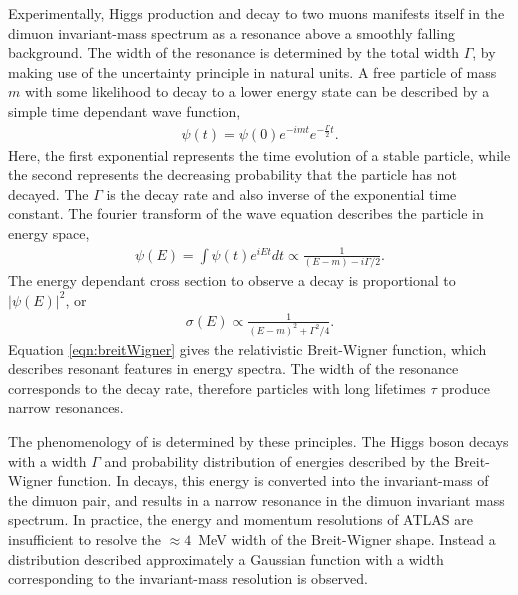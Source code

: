 Experimentally, Higgs production and decay to two muons manifests itself in the dimuon invariant-mass spectrum as a resonance above a smoothly falling background.
The width of the resonance is determined by the total width $\Gamma$, by making use of the uncertainty principle in natural units.
A free particle of mass $m$ with some likelihood to decay to a lower energy state can be described by a simple time dependant wave function,
\begin{equation}\begin{split}
    \psi(t)=\psi(0)e^{-imt}e^{-\frac{\Gamma}{2}t}.
\end{split}\end{equation} 
Here, the first exponential represents the time evolution of a stable particle, while the second represents the decreasing probability that the particle has not decayed.
The $\Gamma$ is the decay rate and also inverse of the exponential time constant.
The fourier transform of the wave equation describes the particle in energy space,
\begin{equation}\begin{split}
    \psi(E)=\int\psi(t)e^{iEt}dt\propto \frac{1}{(E-m)-i\Gamma/2}.
\end{split}\end{equation}
The energy dependant cross section to observe a decay is proportional to $|\psi(E)|^2$, or 
\begin{equation}\begin{split}\label{eqn:breitWigner}
    \sigma(E)\propto\frac{1}{(E-m)^2+\Gamma^2/4}.
\end{split}\end{equation} 
Equation \ref{eqn:breitWigner} gives the relativistic Breit-Wigner function, which describes resonant features in energy spectra.
The width of the resonance corresponds to the decay rate, therefore particles with long lifetimes $\tau$ produce narrow resonances.

The phenomenology of \hmm is determined by these principles.
The Higgs boson decays with a width $\Gamma$ and probability distribution of energies described by the Breit-Wigner function.
In \hmm decays, this energy is converted into the invariant-mass of the dimuon pair, and results in a narrow resonance in the dimuon invariant mass spectrum.
In practice, the energy and momentum resolutions of ATLAS are insufficient to resolve the $\approx4$~MeV width of the Breit-Wigner shape.
Instead a distribution described approximately a Gaussian function with a width corresponding to the invariant-mass resolution is observed.

